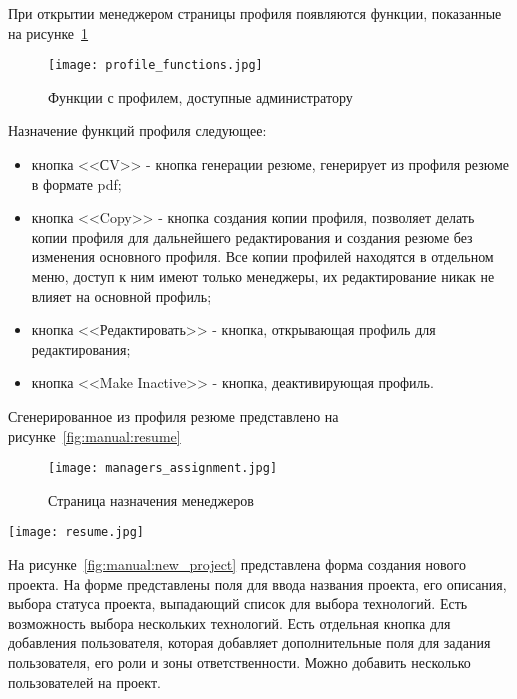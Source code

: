 При открытии менеджером страницы профиля появляются функции, показанные на рисунке~\ref{fig:manual:profile_functions}

\begin{figure}[ht]
  \centering
    \texttt{[image: profile\_functions.jpg]}
    \caption{Функции с профилем, доступные администратору}
    \label{fig:manual:profile_functions}
\end{figure}

\pagebreak

Назначение функций профиля следующее:
\begin{itemize}
	\item кнопка <<СV>> - кнопка генерации резюме, генерирует из профиля резюме в формате pdf;
  \item кнопка <<Copy>> - кнопка создания копии профиля, позволяет делать копии профиля для дальнейшего редактирования
  и создания резюме без изменения основного профиля. Все копии профилей находятся в отдельном меню, доступ к ним имеют
  только менеджеры, их редактирование никак не влияет на основной профиль;
	\item кнопка <<Редактировать>> - кнопка, открывающая профиль для редактирования;
	\item кнопка <<Make Inactive>> - кнопка, деактивирующая профиль.
\end{itemize}

Сгенерированное из профиля резюме представлено на рисунке~\ref{fig:manual:resume}

\begin{figure}[ht]
  \centering
    \texttt{[image: managers\_assignment.jpg]}
    \caption{Страница назначения менеджеров}
    \label{fig:manual:managers_assignment}
\end{figure}


\begin{sidewaysfigure}
  \centering
    \texttt{[image: resume.jpg]}
    \caption{Сгенерированное из профиля резюме в формате pdf}
    \label{fig:manual:resume}
\end{sidewaysfigure}

На рисунке~\ref{fig:manual:new_project} представлена форма создания нового проекта. На форме представлены поля для ввода
названия проекта, его описания, выбора статуса проекта, выпадающий список для выбора технологий. Есть возможность
выбора нескольких технологий. Есть отдельная кнопка для добавления пользователя, которая добавляет дополнительные поля
для задания пользователя, его роли и зоны ответственности. Можно добавить несколько пользователей на проект.

